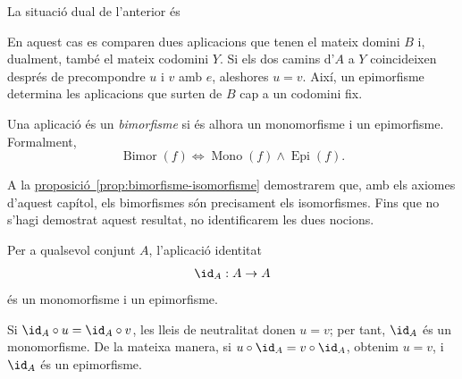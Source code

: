 La situació dual de l'anterior és
\begin{center}
\end{center}

En aquest cas es comparen dues aplicacions que tenen el mateix domini \(B\) i, dualment, també el mateix codomini \(Y\). Si els dos camins d'\(A\) a \(Y\) coincideixen després de precompondre \(u\) i \(v\) amb \(e\), aleshores \(u=v\). Així, un epimorfisme determina les aplicacions que surten de \(B\) cap a un codomini fix.

\begin{definicio}[Bimorfisme]\label{def:bimorfisme}
Una aplicació és un \emph{bimorfisme} si és alhora un monomorfisme i un epimorfisme. Formalment,
\[
\operatorname{Bimor}(f)
\iff
\operatorname{Mono}(f)\land\operatorname{Epi}(f).
\]
\end{definicio}

A la \hyperref[prop:bimorfisme-isomorfisme]{proposició~\ref*{prop:bimorfisme-isomorfisme}} demostrarem que, amb els axiomes d'aquest capítol, els bimorfismes són precisament els isomorfismes. Fins que no s'hagi demostrat aquest resultat, no identificarem les dues nocions.

\begin{proposicio}\label{prop:identitat-mono-epi}
Per a qualsevol conjunt \(A\), l'aplicació identitat
\[
\id_A:A\to A
\]
és un monomorfisme i un epimorfisme.
\end{proposicio}

\begin{prova}
Si \(\id_A\circ u=\id_A\circ v\), les lleis de neutralitat donen \(u=v\); per tant, \(\id_A\) és un monomorfisme. De la mateixa manera, si \(u\circ\id_A=v\circ\id_A\), obtenim \(u=v\), i \(\id_A\) és un epimorfisme.
\end{prova}

